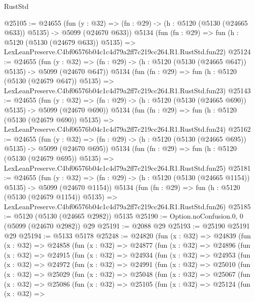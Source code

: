 \begin{lexlean}{RustStd}
\begin{coremodule}
@25105 := @24655
    (fun (y : @32) => (fn : @29) -> (h : @5120 (@5130 (@24665 @633)) @5135) -> @5099 (@24670 @633))
    @5134
    (fun (fn : @29) =>
    fun (h : @5120 (@5130 (@24679 @633)) @5135) =>
    LexLeanPreserve.C4bf06576b04c1c4d79a2ff7c219cc264.R1.RustStd.fun22)
@25124 := @24655
    (fun (y : @32) => (fn : @29) -> (h : @5120 (@5130 (@24665 @647)) @5135) -> @5099 (@24670 @647))
    @5134
    (fun (fn : @29) =>
    fun (h : @5120 (@5130 (@24679 @647)) @5135) =>
    LexLeanPreserve.C4bf06576b04c1c4d79a2ff7c219cc264.R1.RustStd.fun23)
@25143 := @24655
    (fun (y : @32) => (fn : @29) -> (h : @5120 (@5130 (@24665 @690)) @5135) -> @5099 (@24670 @690))
    @5134
    (fun (fn : @29) =>
    fun (h : @5120 (@5130 (@24679 @690)) @5135) =>
    LexLeanPreserve.C4bf06576b04c1c4d79a2ff7c219cc264.R1.RustStd.fun24)
@25162 := @24655
    (fun (y : @32) => (fn : @29) -> (h : @5120 (@5130 (@24665 @695)) @5135) -> @5099 (@24670 @695))
    @5134
    (fun (fn : @29) =>
    fun (h : @5120 (@5130 (@24679 @695)) @5135) =>
    LexLeanPreserve.C4bf06576b04c1c4d79a2ff7c219cc264.R1.RustStd.fun25)
@25181 := @24655
    (fun (y : @32) =>
    (fn : @29) -> (h : @5120 (@5130 (@24665 @1154)) @5135) -> @5099 (@24670 @1154))
    @5134
    (fun (fn : @29) =>
    fun (h : @5120 (@5130 (@24679 @1154)) @5135) =>
    LexLeanPreserve.C4bf06576b04c1c4d79a2ff7c219cc264.R1.RustStd.fun26)
@25185 := @5120 (@5130 (@24665 @2982)) @5135
@25190 := Option.noConfusion.{0, 0} (@5099 (@24670 @2982)) @29
@25191 := @2088 @29
@25193 := @25190 @25191 @29
@25194 := @5133 @5178
@25248 := @24820
    (fun (x : @32) =>
    @24839
      (fun (x : @32) =>
      @24858
        (fun (x : @32) =>
        @24877
          (fun (x : @32) =>
          @24896
            (fun (x : @32) =>
            @24915
              (fun (x : @32) =>
              @24934
                (fun (x : @32) =>
                @24953
                  (fun (x : @32) =>
                  @24972
                    (fun (x : @32) =>
                    @24991
                      (fun (x : @32) =>
                      @25010
                        (fun (x : @32) =>
                        @25029
                          (fun (x : @32) =>
                          @25048
                            (fun (x : @32) =>
                            @25067
                              (fun (x : @32) =>
                              @25086
                                (fun (x : @32) =>
                                @25105
                                  (fun (x : @32) =>
                                  @25124
                                    (fun (x : @32) =>

\end{coremodule}
\end{lexlean}
